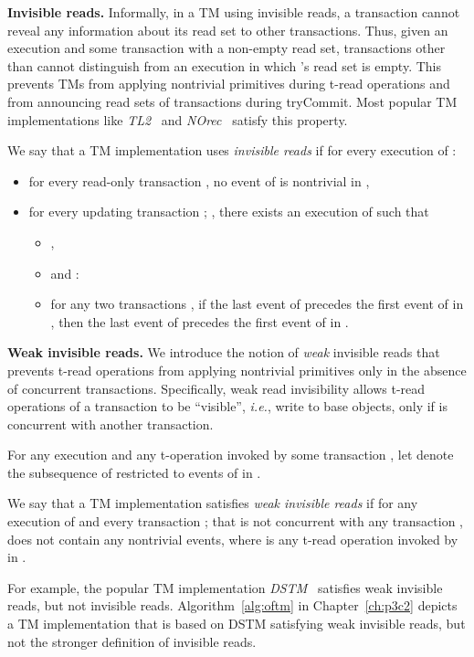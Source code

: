 \vspace{1mm}\noindent\textbf{Invisible reads.}
Informally, in a TM using invisible reads, 
a transaction cannot reveal any information about its read set to
other transactions. Thus, given an execution  and some transaction
 with a non-empty read set, transactions other than  cannot
distinguish  from an execution in which 's read set is empty.
This prevents TMs from applying nontrivial primitives
during t-read operations and from announcing read sets of transactions during tryCommit.
Most popular TM implementations like \emph{TL2}~\cite{DSS06} and
\emph{NOrec}~\cite{norec} satisfy this property.
\begin{definition}
We say that a TM implementation  uses \emph{invisible reads} if
for every execution  of :
\begin{itemize}
\item
for every read-only transaction , 
no event of  is nontrivial in , 
\item
for every updating transaction ; , 
there exists an execution  of  such that
\begin{itemize}
\item
,
\item
 and : 
\item
for any two transactions , 
if the last event of  precedes the first event of  in , 
then the last event of  precedes the first event of  in .
\end{itemize}
\end{itemize}
\end{definition}
\vspace{1mm}\noindent\textbf{Weak invisible reads.}
We introduce the notion of \emph{weak} invisible reads that prevents t-read operations
from applying nontrivial primitives only in the absence of concurrent transactions.
Specifically, weak read invisibility allows t-read operations of a transaction
 to be ``visible'', \emph{i.e.}, write to base objects, only if  is concurrent with
another transaction.
\begin{definition}
For any execution  and any t-operation  invoked by some transaction ,
let  denote the subsequence of  restricted to events of  in .

We say that a TM implementation  satisfies \emph{weak invisible reads}
if for any execution  of  and every transaction ;  that is
not concurrent with any transaction ,  does not contain any nontrivial events, where  is
any t-read operation invoked by  in .
\end{definition}
For example, the popular TM implementation \emph{DSTM}~\cite{HLM+03} satisfies weak invisible reads, but not invisible reads.
Algorithm~\ref{alg:oftm} in Chapter~\ref{ch:p3c2} 
depicts a TM implementation that is based on DSTM satisfying weak invisible reads, but not
the stronger definition of invisible reads.
